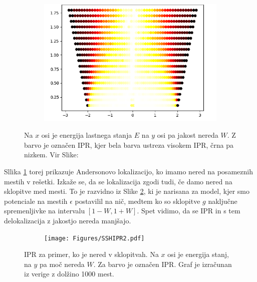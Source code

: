\begin{figure}[H]
\centering
\begin{subfigure}{.7\textwidth}
\includegraphics[width=\linewidth]{Figures/AndersonIPR.pdf}
\end{subfigure}
\caption{Na $x$ osi je energija lastnega stanja $E$ na $y$ osi pa jakost nereda $W$. Z barvo je označen IPR, kjer bela barva ustreza visokem IPR, črna pa nizkem. Vir Slike: \cite{anderson}}
\label{fig:AndersonIPR}
\end{figure}
Sllika \ref{fig:AndersonIPR} torej prikazuje Andersonovo lokalizacijo, ko imamo nered na posameznih mestih v rešetki. Izkaže se, da se lokalizacija zgodi tudi, če damo nered na sklopitve med mesti. To je razvidno iz Slike \ref{fig:SSHIPR}, ki je narisana za model, kjer smo potenciale na mestih $\epsilon$ postavilil na nič, medtem ko so sklopitve $g$ naključne spremenljivke na intervalu $[1-W,1+W]$. Spet vidimo, da se IPR in s tem delokalizacija z jakostjo nereda manjšajo.
\begin{figure}[H]
\centering
\begin{subfigure}{\textwidth}
\texttt{[image: Figures/SSHIPR2.pdf]}
\end{subfigure}
\caption{IPR za primer, ko je nered v sklopitvah. Na $x$ osi je energija stanj, na $y$ pa moč nereda $W$. Za barvo je označen IPR. Graf je izračunan iz verige z dolžino 1000 mest.}
\label{fig:SSHIPR}
\end{figure}


